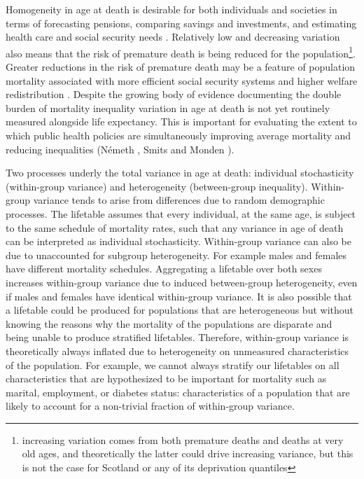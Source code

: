 \documentclass[12pt,oneside,a4paper]{article} %
\theoremstyle{definition}
\begin{document}
Homogeneity in age at death is desirable for both individuals and societies in terms of forecasting pensions, comparing savings and investments, and estimating health care and social security needs \citep{Raalte2011}. Relatively low and decreasing variation also
means that the risk of premature death is being reduced for the population\footnote{increasing variation comes from both
premature deaths and deaths at very old ages, and theoretically the latter could
drive increasing variance, but this is not the case for Scotland or any of its
deprivation quantiles}. Greater reductions in the risk of premature death may be a feature of population mortality associated with more efficient social security systems and higher welfare redistribution 
\citep{Raalte2012,Bambra2011,Popham2013}. Despite the growing body of evidence documenting the double burden of mortality inequality variation in age at death is not yet routinely measured alongside life expectancy. This is important for evaluating the extent to which public health policies are simultaneously improving average mortality and reducing inequalities (N\'emeth \citeyear{Nemeth2017}, Smits and Monden \citeyear{Smits2009}).
  
Two processes underly the total variance in age at death: individual
stochasticity (within-group variance) and heterogeneity (between-group
inequality). Within-group variance tends to arise from differences due to random
demographic processes. The lifetable assumes that every individual, at the same age, is subject
to the same schedule of mortality rates, such that any
variance in age of death can be interpreted as individual stochasticity.
Within-group variance can also be due to unaccounted for subgroup heterogeneity.
For example males and females have different mortality schedules. Aggregating
a lifetable over both sexes increases within-group variance due to induced
between-group heterogeneity, even if males and females have identical
within-group variance. It is also possible that a lifetable could be produced for populations that are
heterogeneous but without knowing the reasons why the mortality of the populations are disparate and being unable to produce stratified lifetables. Therefore, within-group variance is theoretically always inflated
due to heterogeneity on unmeasured characteristics of the population. For
example, we cannot always stratify our lifetables on all characteristics that are hypothesized to be important for mortality such as marital, employment, or diabetes status: characteristics of a population that are likely to account for a
non-trivial fraction of within-group variance.
\end{document}
